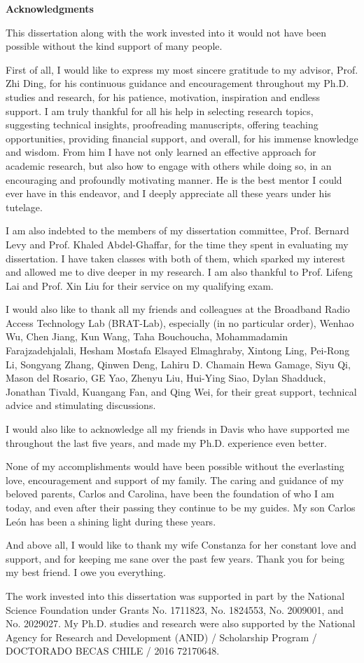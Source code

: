 \newpage
\centerline{\Huge \bf {Acknowledgments}} \vspace{18pt}


This dissertation along with the work invested into it would not have been possible without the kind support of many people.

First of all, I would like to express my most sincere gratitude to my advisor,
Prof. Zhi Ding, 
for his continuous guidance and encouragement throughout my Ph.D. studies and research, for his patience, motivation, inspiration and endless support.
I am truly thankful for all his help in selecting research topics, suggesting technical insights, proofreading manuscripts, offering teaching opportunities, providing financial support, and overall, for his immense knowledge and wisdom. 
From him I have not only learned an effective approach for academic research, but also how to engage with others while doing so, in an encouraging and profoundly motivating manner.
He is the best mentor I could ever have in this endeavor, and I deeply appreciate all these years under his tutelage.

I am also indebted to the members of my dissertation committee, Prof. Bernard Levy and Prof. Khaled Abdel-Ghaffar, for the time they spent in evaluating my dissertation. 
I have taken classes with both of them, which sparked my interest and allowed me to dive deeper in my research. 
I am also thankful to Prof. Lifeng Lai and Prof. Xin Liu for their service on my qualifying exam. 

I would also like to thank all my friends and colleagues at the Broadband Radio Access Technology Lab (BRAT-Lab), especially (in no particular order), 
Wenhao Wu, 
Chen Jiang,
Kun Wang, 
Taha Bouchoucha, 
Mohammadamin Farajzadehjalali, 
Hesham Mostafa Elsayed Elmaghraby, 
Xintong Ling,
Pei-Rong Li, 
Songyang Zhang, 
Qinwen Deng, 
Lahiru D. Chamain Hewa Gamage, 
Siyu Qi, 
Mason del Rosario, 
GE Yao, 
Zhenyu Liu, 
Hui-Ying Siao, 
Dylan Shadduck, 
Jonathan Tivald, 
Kuangang Fan, 
and Qing Wei, 
for their great support, technical advice and stimulating discussions.

I would also like to acknowledge all my friends in Davis who have supported me throughout the last five years, and made my Ph.D. experience even better. 

None of my accomplishments would have been possible without the
everlasting love, encouragement and support of my family. The caring and
guidance of my beloved parents, Carlos and Carolina, have been the foundation of who I am today, and even after their passing they continue to be my guides. My son Carlos Le\'on has been a shining light during these years.

And above all, I would like to thank my wife Constanza for her constant love and support, and for keeping me sane over the past few years. Thank you for being my best friend. I owe you everything.

The work invested into this dissertation was supported in part by the National
Science Foundation under Grants No. 1711823, No. 1824553, No. 2009001, and No. 2029027. 
My Ph.D. studies and research were also supported by the National Agency for Research and Development (ANID) / Scholarship Program / DOCTORADO BECAS CHILE / 2016 72170648.
